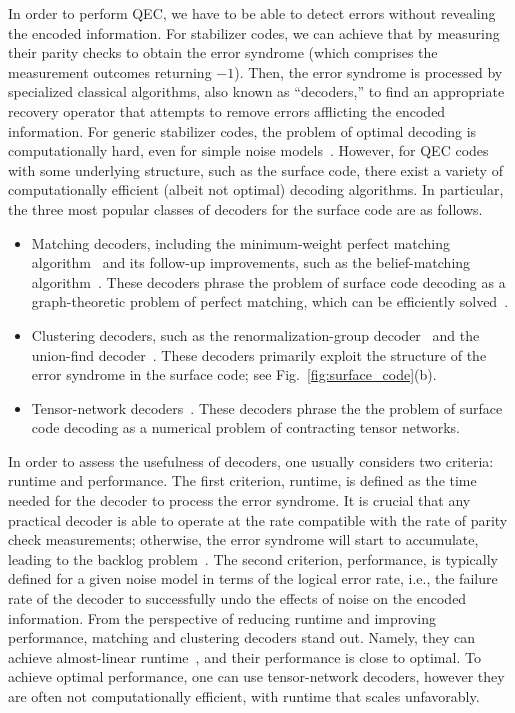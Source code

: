 \begin{refsection}
In order to perform QEC, we have to be able to detect errors without revealing the encoded information.
For stabilizer codes, we can achieve that by measuring their parity checks to obtain the error syndrome (which comprises the measurement outcomes returning $-1$).
Then, the error syndrome is processed by specialized classical algorithms, also known as ``decoders,'' to find an appropriate recovery operator that attempts to remove errors afflicting the encoded information.
For generic stabilizer codes, the problem of optimal decoding is computationally hard, even for simple noise models~\cite{iyer2015hardnessDecoding}.
However, for QEC codes with some underlying structure, such as the surface code, there exist a variety of computationally efficient (albeit not optimal) decoding algorithms.
In particular, the three most popular classes of decoders for the surface code are as follows.
\begin{itemize}
\item Matching decoders, including the minimum-weight perfect matching algorithm~\cite{dennis2002TopologicalQuantumMemory} and its follow-up improvements, such as the belief-matching algorithm~\cite{higgott2023improvedDecodingCircuitNoise}.
These decoders phrase the problem of surface code decoding as a graph-theoretic problem of perfect matching, which can be efficiently solved~\cite{edmonds1965pathsTreesFlowers}.
\item Clustering decoders, such as the renormalization-group decoder~\cite{duclosCianci2010fastDecoders,anwar2014fastDecoders} and the union-find decoder~\cite{delfosse2021almostLinearTimeDecoding}.
These decoders primarily exploit the structure of the error syndrome in the surface code; see Fig.~\ref{fig:surface_code}(b).
\item Tensor-network decoders~\cite{bravyi2014efficientAlgorithmsMaxLikelihood,darmawan2017tensorNetworkSurfaceCode,chubb2021tensorNetworkDecoding}.
These decoders phrase the the problem of surface code decoding as a numerical problem of contracting tensor networks.
\end{itemize}


In order to assess the usefulness of decoders, one usually considers two criteria: runtime and performance.
The first criterion, runtime, is defined as the time needed for the decoder to process the error syndrome.
It is crucial that any practical decoder is able to operate at the rate compatible with the rate of parity check measurements; otherwise, the error syndrome will start to accumulate, leading to the backlog problem~\cite{terhal2015QECforQuantumMemories}.
The second criterion, performance, is typically defined for a given noise model in terms of the logical error rate, i.e., the failure rate of the decoder to successfully undo the effects of noise on the encoded information.
From the perspective of reducing runtime and improving performance, matching and clustering decoders stand out.
Namely, they can achieve almost-linear runtime~\cite{higgott2023sparseBlossom,delfosse2021almostLinearTimeDecoding}, and their performance is close to optimal.
To achieve optimal performance, one can use tensor-network decoders, however they are often not computationally efficient, with runtime that scales unfavorably.



\end{refsection}

